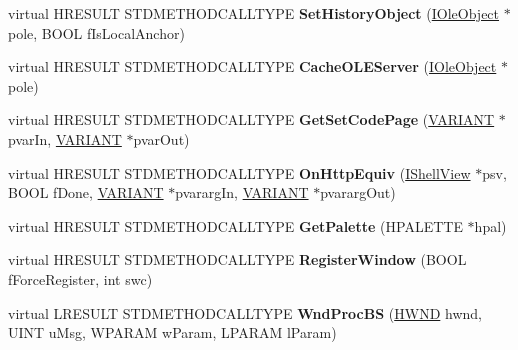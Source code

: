 \begin{DoxyCompactItemize}
virtual H\+R\+E\+S\+U\+LT S\+T\+D\+M\+E\+T\+H\+O\+D\+C\+A\+L\+L\+T\+Y\+PE {\bfseries Set\+History\+Object} (\hyperlink{interface_i_ole_object}{I\+Ole\+Object} $\ast$pole, B\+O\+OL f\+Is\+Local\+Anchor)
\item 
\mbox{\label{class_c_common_browser_a23ba06602552720aa0996d7f4ec75f1b}} 
virtual H\+R\+E\+S\+U\+LT S\+T\+D\+M\+E\+T\+H\+O\+D\+C\+A\+L\+L\+T\+Y\+PE {\bfseries Cache\+O\+L\+E\+Server} (\hyperlink{interface_i_ole_object}{I\+Ole\+Object} $\ast$pole)
\item 
\mbox{\label{class_c_common_browser_a684027a68424d19a54dfa748a812a2ea}} 
virtual H\+R\+E\+S\+U\+LT S\+T\+D\+M\+E\+T\+H\+O\+D\+C\+A\+L\+L\+T\+Y\+PE {\bfseries Get\+Set\+Code\+Page} (\hyperlink{structtag_v_a_r_i_a_n_t}{V\+A\+R\+I\+A\+NT} $\ast$pvar\+In, \hyperlink{structtag_v_a_r_i_a_n_t}{V\+A\+R\+I\+A\+NT} $\ast$pvar\+Out)
\item 
\mbox{\label{class_c_common_browser_a8a36a359cb2599f69071bdfd1d6e9cb5}} 
virtual H\+R\+E\+S\+U\+LT S\+T\+D\+M\+E\+T\+H\+O\+D\+C\+A\+L\+L\+T\+Y\+PE {\bfseries On\+Http\+Equiv} (\hyperlink{interface_i_shell_view}{I\+Shell\+View} $\ast$psv, B\+O\+OL f\+Done, \hyperlink{structtag_v_a_r_i_a_n_t}{V\+A\+R\+I\+A\+NT} $\ast$pvararg\+In, \hyperlink{structtag_v_a_r_i_a_n_t}{V\+A\+R\+I\+A\+NT} $\ast$pvararg\+Out)
\item 
\mbox{\label{class_c_common_browser_aeb94e5b824c78a40431d220a1425b165}} 
virtual H\+R\+E\+S\+U\+LT S\+T\+D\+M\+E\+T\+H\+O\+D\+C\+A\+L\+L\+T\+Y\+PE {\bfseries Get\+Palette} (H\+P\+A\+L\+E\+T\+TE $\ast$hpal)
\item 
\mbox{\label{class_c_common_browser_a0964d1714f7e59678234d114cce999ab}} 
virtual H\+R\+E\+S\+U\+LT S\+T\+D\+M\+E\+T\+H\+O\+D\+C\+A\+L\+L\+T\+Y\+PE {\bfseries Register\+Window} (B\+O\+OL f\+Force\+Register, int swc)
\item 
\mbox{\label{class_c_common_browser_a7ec6e2a9365c118db1ce4f7bdb8e86e4}} 
virtual L\+R\+E\+S\+U\+LT S\+T\+D\+M\+E\+T\+H\+O\+D\+C\+A\+L\+L\+T\+Y\+PE {\bfseries Wnd\+Proc\+BS} (\hyperlink{interfacevoid}{H\+W\+ND} hwnd, U\+I\+NT u\+Msg, W\+P\+A\+R\+AM w\+Param, L\+P\+A\+R\+AM l\+Param)
\item 

\end{DoxyCompactItemize}
